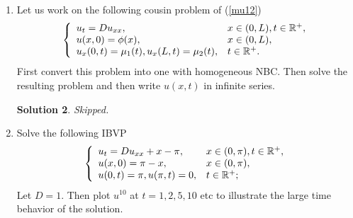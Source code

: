 \documentclass[6pt]{article}
\newtheorem{solution}{Solution}
\numberwithin{equation}{section}
\def\mathbb{\Bbb}
\begin{document}
\begin{enumerate}
2) pick an alternative $w^{(2)}(x,t)$ of your own choice and then find the corresponding $u^{(2)}(x,t)$;

3) plot $u^{(1)}(x,t)$ and $u^{(2)}(x,t)$ with truncated $N$ for several $t$, say $N=10$, probably you want to test first that $N=10$ is large enough as previous HWs.  Then show that $u^{(1)}(x,t)$ and $u^{(2)}(x,t)$ are the same for all time;

4) try to prove that $u^{(1)}(x,t)$ and $u^{(2)}(x,t)$ equal analytically.
\begin{solution}
Skipped.
\end{solution}

\item Let us work on the following cousin problem of (\ref{mu12})
\begin{equation}
\left\{
\begin{array}{ll}
u_t=Du_{xx},& x\in(0,L),t\in\mathbb R^+,\\
u(x,0)=\phi(x),&x\in(0,L),\\
u_x(0,t)=\mu_1(t), u_x(L,t)=\mu_2(t), &t\in\mathbb R^+.
\end{array}
\right.
\end{equation}
First convert this problem into one with homogeneous NBC.  Then solve the resulting problem and then write $u(x,t)$ in infinite series.
\begin{solution}
Skipped.
\end{solution}


\item Solve the following IBVP
\begin{equation}\label{4}
\left\{
\begin{array}{ll}
u_t=Du_{xx}+x-\pi,& x\in(0,\pi),t\in\mathbb R^+,\\
u(x,0)=\pi-x,&x\in(0,\pi),\\
u(0,t)=\pi, u(\pi,t)=0, &t\in\mathbb R^+;
\end{array}
\right.
\end{equation}
Let $D=1$.  Then plot $u^{10}$ at $t=1,2,5,10$ etc to illustrate the large time behavior of the solution.


\end{enumerate}
\end{document}
